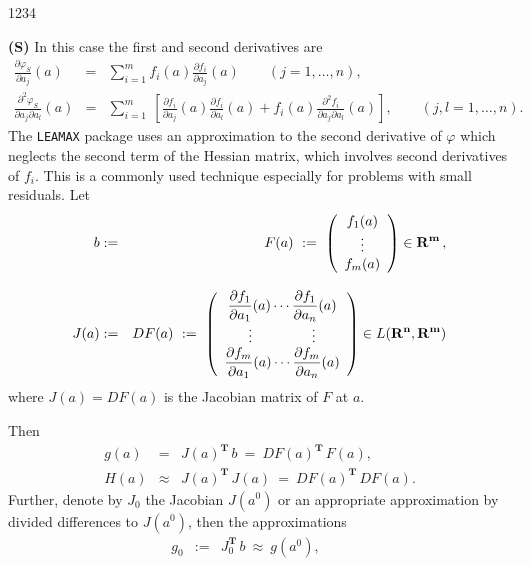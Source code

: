 \begin{DL}{1234}
\item[{\bf (S)}] In this case the first and second derivatives are
\begin{eqnarray*}
\frac{\partial \varphi_S}{\partial a_j} (a) & = & \sum_{i=1}^m f_i(a)
\frac{\partial f_i}{\partial a_j}(a) \qquad (j=1,\ldots,n), \\
\frac{\partial^2 \varphi_S}{\partial a_j \partial a_l} (a) & = &
\sum_{i=1}^m  \: \left[ \frac{\partial f_i}{\partial a_j} (a)
\frac{\partial f_i}{\partial a_l} (a) + f_i(a)
\frac{\partial^2 f_i}{\partial a_j \partial a_l} (a) \right],
\qquad  (j,l=1,\ldots,n).
\end{eqnarray*}
The {\tt LEAMAX} package uses an approximation to the second
derivative of $\varphi$ which neglects the second term
of the Hessian matrix,
which involves second derivatives of $f_i$. This is a commonly
used technique especially for problems with small residuals. Let
\begin{eqnarray*}
  b & := & F(a) \ := \ \left( \begin{array}{c}
  f_1(a) \\ \vdots \\ f_m(a) \end{array} \right) \in \mathbf{R^m}\,,
  \\[3mm]
  J(a) & := & DF(a) \ := \ \left( \begin{array}{c} \displaystyle
  \frac{\partial f_1}{\partial a_1}(a) \cdots
  \frac{\partial f_1}{\partial a_n}(a) \\
  \displaystyle \vdots  \hspace{15mm} \vdots \\ \displaystyle
  \frac{\partial f_m}{\partial a_1}(a) \cdots
  \frac{\partial f_m}{\partial a_n}(a) \end{array} \right)
  \in L(\mathbf{R^n},\mathbf{R^m})
\end{eqnarray*}
where $J(a)=DF(a)$ is the Jacobian matrix of $F$ at $a$.
\par
Then
\begin{eqnarray*}
 g(a) & = & J(a)^{\mathbf{T}}\,b \ = \ DF(a)^{\mathbf{T}}\,F(a), \\
 H(a) & \approx & J(a)^{\mathbf{T}}\,
 J(a) \ = \ DF(a)^{\mathbf{T}}\,DF(a).
\end{eqnarray*}
Further, denote by $J_0$ the Jacobian $J(a^0)$ or an appropriate
approximation by divided differences to $J(a^0)$, then the
approximations
\begin{eqnarray*}
g_0 & := & J_0^{\mathbf{T}}\,b \ \approx \ g(a^0), \qquad

\end{eqnarray*}
\end{DL}
